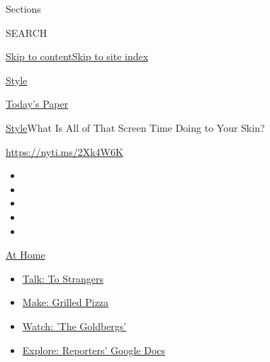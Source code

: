 Sections

SEARCH

\protect\hyperlink{site-content}{Skip to
content}\protect\hyperlink{site-index}{Skip to site index}

\href{https://www.nytimes3xbfgragh.onion/section/style}{Style}

\href{https://myaccount.nytimes3xbfgragh.onion/auth/login?response_type=cookie\&client_id=vi}{}

\href{https://www.nytimes3xbfgragh.onion/section/todayspaper}{Today's
Paper}

\href{/section/style}{Style}\textbar{}What Is All of That Screen Time
Doing to Your Skin?

\href{https://nyti.ms/2Xk4W6K}{https://nyti.ms/2Xk4W6K}

\begin{itemize}
\item
\item
\item
\item
\item
\end{itemize}

\href{https://www.nytimes3xbfgragh.onion/spotlight/at-home?action=click\&pgtype=Article\&state=default\&region=TOP_BANNER\&context=at_home_menu}{At
Home}

\begin{itemize}
\tightlist
\item
  \href{https://www.nytimes3xbfgragh.onion/2020/08/03/well/family/the-benefits-of-talking-to-strangers.html?action=click\&pgtype=Article\&state=default\&region=TOP_BANNER\&context=at_home_menu}{Talk:
  To Strangers}
\item
  \href{https://www.nytimes3xbfgragh.onion/2020/08/01/at-home/coronavirus-make-pizza-on-a-grill.html?action=click\&pgtype=Article\&state=default\&region=TOP_BANNER\&context=at_home_menu}{Make:
  Grilled Pizza}
\item
  \href{https://www.nytimes3xbfgragh.onion/2020/07/31/arts/television/goldbergs-abc-stream.html?action=click\&pgtype=Article\&state=default\&region=TOP_BANNER\&context=at_home_menu}{Watch:
  'The Goldbergs'}
\item
  \href{https://www.nytimes3xbfgragh.onion/interactive/2020/at-home/even-more-reporters-editors-diaries-lists-recommendations.html?action=click\&pgtype=Article\&state=default\&region=TOP_BANNER\&context=at_home_menu}{Explore:
  Reporters' Google Docs}
\end{itemize}

